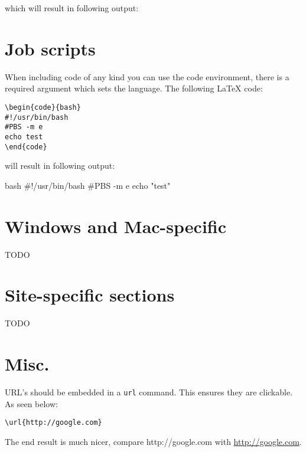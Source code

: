 \documentclass[11pt,a4paper]{article}
\begin{document}
which will result in following output:

\section{Job scripts}
\label{sec:job-scripts}

When including code of any kind you can use the code environment, there is a
required argument which sets the language. The following LaTeX code:

\begin{verbatim}
\begin{code}{bash}
#!/usr/bin/bash
#PBS -m e
echo test
\end{code}
\end{verbatim}

will result in following output:

\begin{code}{bash}
#!/usr/bin/bash
#PBS -m e
echo "test"
\end{code}

\section{Windows and Mac-specific}
TODO

\section{Site-specific sections}
TODO

\section{Misc.}
\label{sec:misc}

URL's should be embedded in a \texttt{url} command. This ensures they are clickable. As seen below:
\begin{verbatim}
\url{http://google.com}
\end{verbatim}

The end result is much nicer, compare http://google.com with \url{http://google.com}.
\end{document}
